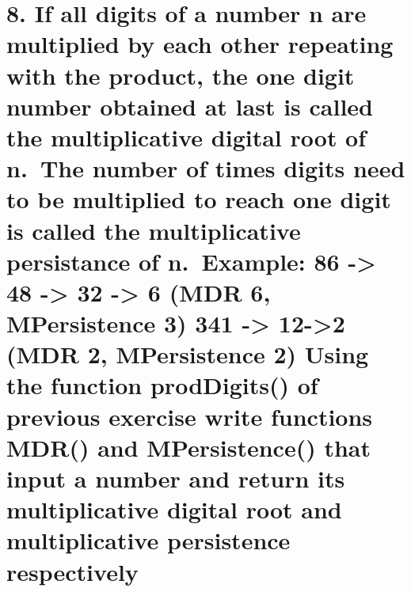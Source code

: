 \documentclass[11pt]{article}
\begin{document}
    \hypertarget{if-all-digits-of-a-number-n-are-multiplied-by-each-other-repeating-with-the-product-the-one-digit-number-obtained-at-last-is-called-the-multiplicative-digital-root-of-n.-the-number-of-times-digits-need-to-be-multiplied-to-reach-one-digit-is-called-the-multiplicative-persistance-of-n.-example-86---48---32---6-mdr-6-mpersistence-3-341---12-2-mdr-2-mpersistence-2-using-the-function-proddigits-of-previous-exercise-write-functions-mdr-and-mpersistence-that-input-a-number-and-return-its-multiplicative-digital-root-and-multiplicative-persistence-respectively}{%
\section{8. If all digits of a number n are multiplied by each other
repeating with the product, the one digit number obtained at last is
called the multiplicative digital root of n.~The number of times digits
need to be multiplied to reach one digit is called the multiplicative
persistance of n.~Example: 86 -\textgreater{} 48 -\textgreater{} 32
-\textgreater{} 6 (MDR 6, MPersistence 3) 341 -\textgreater{}
12-\textgreater2 (MDR 2, MPersistence 2) Using the function prodDigits()
of previous exercise write functions MDR() and MPersistence() that input
a number and return its multiplicative digital root and multiplicative
persistence
respectively}\label{if-all-digits-of-a-number-n-are-multiplied-by-each-other-repeating-with-the-product-the-one-digit-number-obtained-at-last-is-called-the-multiplicative-digital-root-of-n.-the-number-of-times-digits-need-to-be-multiplied-to-reach-one-digit-is-called-the-multiplicative-persistance-of-n.-example-86---48---32---6-mdr-6-mpersistence-3-341---12-2-mdr-2-mpersistence-2-using-the-function-proddigits-of-previous-exercise-write-functions-mdr-and-mpersistence-that-input-a-number-and-return-its-multiplicative-digital-root-and-multiplicative-persistence-respectively}}
\end{document}
